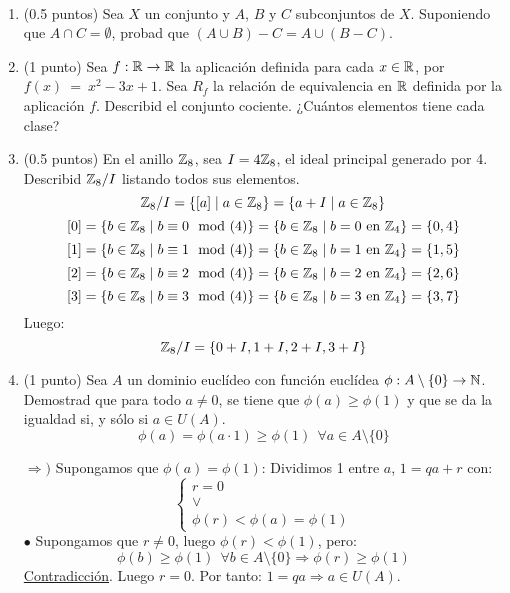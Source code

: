 \documentclass[12pt]{article}
\newcounter{ejercicio}[section] %
\newcounter{ejercicio}
\begin{document}
    \begin{ejercicio}[4 puntos]
        \ 
        \begin{enumerate} 
            \item (0.5 puntos) Sea $X$ un conjunto y $A$, $B$ y $C$ subconjuntos de $X$. Suponiendo que $A \cap C = \emptyset$, probad que $(A \cup B)-C=A\cup (B-C)$.
            \item (1 punto) Sea $f:\mathbb{R}\rightarrow \mathbb{R}$ la aplicación definida para cada $x \in \mathbb{R}$, por $f(x)~=~x^2-3x+1$. Sea $R_f$ la relación de equivalencia en $\mathbb{R}$ definida por la aplicación $f$. Describid el conjunto cociente. ¿Cuántos elementos tiene cada clase?
            \item (0.5 puntos) En el anillo $\mathbb{Z}_8$, sea $I = 4\mathbb{Z}_8$, el ideal principal generado por 4. Describid $\mathbb{Z}_8/I$ listando todos sus elementos.\\

                \noindent
                $$\mathbb{Z}_8/I = \{[a] \mid a \in \mathbb{Z}_8\} = \{a+I \mid a \in \mathbb{Z}_8\}$$
                $$[0] = \{ b \in \mathbb{Z}_8 \mid b \equiv 0 \mod (4) \} = \{ b \in \mathbb{Z}_8 \mid b = 0 \mbox{ en } \mathbb{Z}_4 \} = \{ 0,4 \}$$
                $$[1] = \{ b \in \mathbb{Z}_8 \mid b \equiv 1 \mod (4) \} = \{ b \in \mathbb{Z}_8 \mid b = 1 \mbox{ en } \mathbb{Z}_4 \} = \{ 1,5 \}$$
                $$[2] = \{ b \in \mathbb{Z}_8 \mid b \equiv 2 \mod (4) \} = \{ b \in \mathbb{Z}_8 \mid b = 2 \mbox{ en } \mathbb{Z}_4 \} = \{ 2,6 \}$$
                $$[3] = \{ b \in \mathbb{Z}_8 \mid b \equiv 3 \mod (4) \} = \{ b \in \mathbb{Z}_8 \mid b = 3 \mbox{ en } \mathbb{Z}_4 \} = \{ 3,7 \}$$
                Luego:
                $$\mathbb{Z}_8/I = \{ 0+I, 1+I, 2+I, 3+I \}$$

            \item (1 punto) Sea $A$ un dominio euclídeo con función euclídea $\phi:A \setminus \{0\}\rightarrow \mathbb{N}$. Demostrad que para todo $a \neq 0$, se tiene que $\phi(a) \geq \phi(1)$ y que se da la igualdad si, y sólo si $a \in U(A)$.\\

                $$\phi(a) = \phi(a \cdot 1) \geq \phi(1)~~\forall a \in A \setminus \{0\}$$

                \noindent
                $\Rightarrow)$ Supongamos que $\phi(a) = \phi(1)$:\newline
                Dividimos 1 entre $a$, $1 = qa + r$ con:
                $$\left\{ \begin{array}{l}
                    r = 0 \\
                    \lor \\
                    \phi(r) < \phi(a) = \phi(1)
                \end{array}\right.$$
                $\bullet$ Supongamos que $r \neq 0$, luego $\phi(r) < \phi(1)$, pero:
                $$\phi(b) \geq \phi(1)~~\forall b \in A \setminus\{0\} \Rightarrow \phi(r) \geq \phi(1)$$
                \underline{Contradicción}. Luego $r = 0$.\newline
                Por tanto: $1 = qa \Rightarrow a \in U(A)$.\\


\end{enumerate}
\end{ejercicio}
\end{document}

